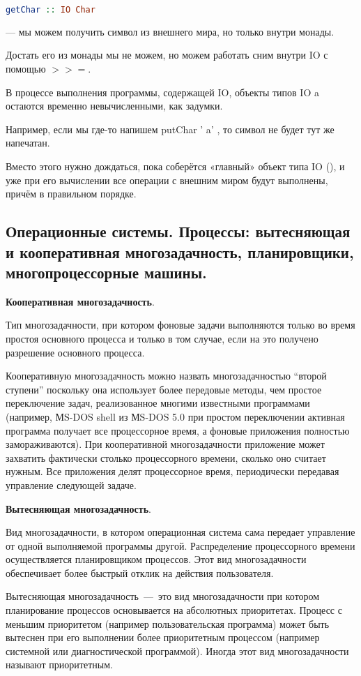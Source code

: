 \documentclass{article}
\begin{document}
\begin{lstlisting}[language=Haskell]
getChar :: IO Char
\end{lstlisting} --- мы можем получить символ из внешнего мира, но только внутри монады.

Достать его из монады мы не можем, но можем работать сним внутри IO с помощью $>>=$.

В процессе выполнения программы, содержащей IO, объекты типов IO a остаются временно невычисленными, как задумки.

Например, если мы где-то напишем putChar ' a' , то символ не будет тут же напечатан.

Вместо этого нужно дождаться, пока соберётся «главный» объект типа IO (), и уже при его вычислении все операции с внешним миром будут выполнены, причём в правильном порядке.

\subsection{Операционные системы. Процессы: вытесняющая и кооперативная многозадачность, планировщики, многопроцессорные машины.}

\textbf{Кооперативная многозадачность}.

Тип многозадачности, при котором фоновые задачи выполняются только во время простоя основного процесса и только в том случае, если на это получено разрешение основного процесса.

Кооперативную многозадачность можно назвать многозадачностью “второй ступени” поскольку она использует более передовые методы, чем простое переключение задач, реализованное многими известными программами (например, МS-DOS shell из МS-DOS 5.0 при простом переключении активная программа получает все процессорное время, а фоновые приложения полностью замораживаются). При кооперативной многозадачности приложение может захватить фактически столько процессорного времени, сколько оно считает нужным. Все приложения делят процессорное время, периодически передавая управление следующей задаче.

\textbf{ Вытесняющая многозадачность}.

Вид многозадачности, в котором операционная система сама передает управление от одной выполняемой программы другой. Распределение процессорного времени осуществляется планировщиком процессов. Этот вид многозадачности обеспечивает более быстрый отклик на действия пользователя.

Вытесняющая многозадачность~---~это вид многозадачности при котором планирование процессов основывается на абсолютных приоритетах. Процесс с меньшим приоритетом (например пользовательская программа) может быть вытеснен при его выполнении более приоритетным процессом (например системной или диагностической программой). Иногда этот вид многозадачности называют приоритетным.
\end{document}
